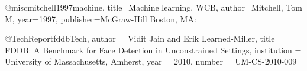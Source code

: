 
@misc{mitchell1997machine,
  title={Machine learning. WCB},
  author={Mitchell, Tom M},
  year={1997},
  publisher={McGraw-Hill Boston, MA:}
}

@TechReport{fddbTech,
  author = {Vidit Jain and Erik Learned-Miller},
  title =  {FDDB: A Benchmark for Face Detection in Unconstrained Settings},
  institution =  {University of Massachusetts, Amherst},
  year = {2010},
  number = {UM-CS-2010-009}
  }

  
